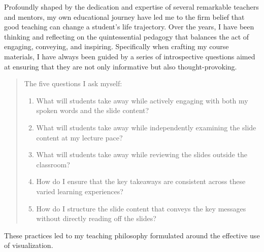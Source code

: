 Profoundly shaped by the dedication and expertise of several remarkable teachers and mentors, my own educational journey have led me to the firm belief that good teaching can change a student's life trajectory. Over the years, I have been thinking and reflecting on the quintessential pedagogy that balances the act of engaging, conveying, and inspiring. Specifically when crafting my course materials, I have always been guided by a series of introspective questions aimed at ensuring that they are not only informative but also thought-provoking.
\begin{quote}
    The five questions I ask myself:
    \begin{enumerate}[nosep,leftmargin=*]
        \item What will students take away while actively engaging with both my spoken words and the slide content?
        \item What will students take away while independently examining the slide content at my lecture pace?
        \item What will students take away while reviewing the slides outside the classroom?
        \item How do I ensure that the key takeaways are consistent across these varied learning experiences?
        \item How do I structure the slide content that conveys the key messages without directly reading off the slides?
    \end{enumerate}
\end{quote}
These practices led to my teaching philosophy formulated around the effective use of visualization.

